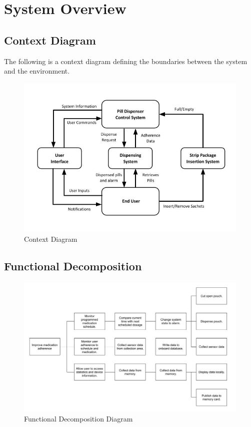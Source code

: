 \documentclass[12pt]{article}
\begin{document}
\section{System Overview}

\subsection{Context Diagram}
The following is a context diagram defining the boundaries between the system and the environment.
 \begin{figure}[htp!]
  \centering
  \includegraphics[width=1\linewidth]{ContextDiagram.jpg}
  \caption{Context Diagram}
\end{figure}


\subsection{Functional Decomposition}
\begin{figure}[!htbp]
    \centering
    \includegraphics[width=\textwidth,height=\textheight,keepaspectratio]{project_requirements/FuncDecomp.jpg}
    \caption{Functional Decomposition Diagram}
    \label{fig:my_label}
\end{figure}
\end{document}
